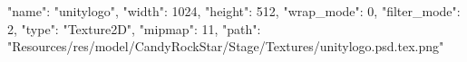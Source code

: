 {
  "name": "unitylogo",
  "width": 1024,
  "height": 512,
  "wrap_mode": 0,
  "filter_mode": 2,
  "type": "Texture2D",
  "mipmap": 11,
  "path": "Resources/res/model/CandyRockStar/Stage/Textures/unitylogo.psd.tex.png"
}